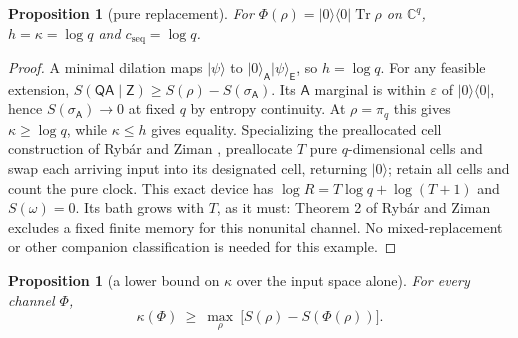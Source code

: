 \documentclass[11pt,a4paper]{article}
\numberwithin{equation}{section}
\theoremstyle{plain}
\newtheorem{proposition}[theorem]{Proposition}
\theoremstyle{definition}
\DeclareMathOperator{\Tr}{Tr}
\newcommand{\rg}[1]{\mathsf{#1}}
\newcommand{\CC}{\mathbb{C}}
\newcommand{\cseq}{c_{\mathrm{seq}}}
\newcommand{\ket}[1]{\lvert #1 \rangle}
\newcommand{\ketbra}[2]{\lvert #1 \rangle\langle #2 \rvert}
\begin{document}
\begin{proposition}[pure replacement]
\label{prop:pure-replacer}
For $\Phi(\rho)=\ketbra{0}{0}\Tr\rho$ on $\CC^q$, $h=\kappa=\log q$ and
$\cseq=\log q$.
\end{proposition}

\begin{proof}
A minimal dilation maps $\ket{\psi}$ to $\ket{0}_{\rg{A}}\ket{\psi}_{\rg{E}}$,
so $h=\log q$. For any feasible extension,
$S(\rg{Q}\rg{A}\mid\rg{Z})\ge S(\rho)-S(\sigma_{\rg{A}})$. Its $\rg{A}$
marginal is within $\varepsilon$ of $\ketbra{0}{0}$, hence
$S(\sigma_{\rg{A}})\to 0$ at fixed $q$ by entropy continuity. At $\rho=\pi_q$
this gives $\kappa\ge\log q$, while $\kappa\le h$ gives equality.
Specializing the preallocated cell construction of Ryb\'ar and Ziman
\cite[section III]{RybarZiman2008}, preallocate
$T$ pure $q$-dimensional cells and swap each arriving input into its
designated cell, returning $\ket{0}$; retain all cells and count the pure
clock. This exact device has $\log R=T\log q+\log(T+1)$ and $S(\omega)=0$. Its
bath grows with $T$, as it must: Theorem 2 of Ryb\'ar and Ziman excludes a
fixed finite memory for this nonunital channel. No mixed-replacement or other
companion classification is needed for this example.
\end{proof}

\begin{proposition}[a lower bound on $\kappa$ over the input space alone]
\label{prop:kappa-lower}
For every channel $\Phi$,
\[
\kappa(\Phi)\ \ge\ \max_\rho\ \bigl[S(\rho)-S(\Phi(\rho))\bigr].
\]
\end{proposition}
\end{document}
